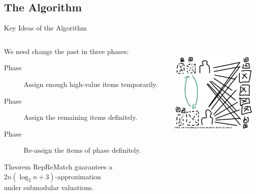\subsection{The Algorithm}
\begin{frame}{Key Ideas of the Algorithm}
	\begin{columns}[t, onlytextwidth]
		\begin{column}{0.6\textwidth}
			We need change the past in three phases:
			\begin{description}
				\item[Phase \phasei]
				Assign enough high-value items temporarily.

				\item[Phase \phaseii]
				Assign the remaining items definitely.

				\item[Phase \phaseiii]
				Re-assign the items of phase \phasei{} definitely.
			\end{description}

			\smallskip

			\begin{exampleblock}{Theorem}
				RepReMatch guarantees a \(2n(\log_2 n + 3)\)-approximation \\
				under submodular valuations.
			\end{exampleblock}
		\end{column}
		\begin{column}{0.4\textwidth}
			\vphantom{a}\vspace{-0.5\baselineskip}\par
			\centering
			\includegraphics[height=5cm]{img/phases}
		\end{column}
	\end{columns}
\end{frame}

